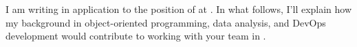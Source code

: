I am writing in application to the position of \position{} at \companyname{}. In what follows, I'll explain how my background in object-oriented programming, data analysis, and DevOps development would contribute to working with your team in \city{}. 